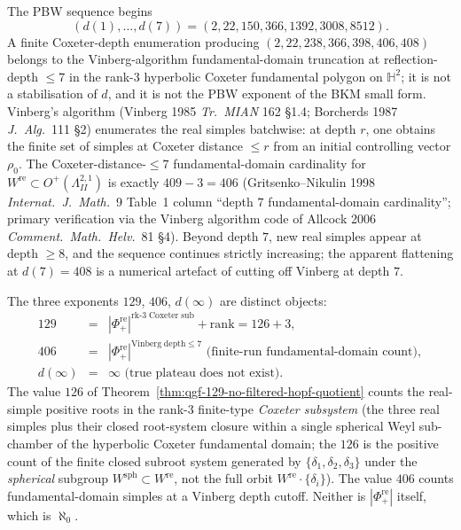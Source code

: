 \begin{remark}
\label{rem:qgf-plateau-reconciliation}
The PBW sequence begins
\[
 (d(1),\ldots,d(7))=(2,22,150,366,1392,3008,8512).
\]
A finite Coxeter-depth enumeration producing
\((2,22,238,366,398,406,408)\) belongs to the Vinberg-algorithm
fundamental-domain truncation at reflection-depth \(\leq 7\) in the
rank-$3$ hyperbolic Coxeter fundamental polygon on $\mathbb H^2$; it is
not a stabilisation of \(d\), and it is not the PBW exponent of the BKM
small form. Vinberg's algorithm (Vinberg 1985 \emph{Tr.~MIAN}
162 \S1.4; Borcherds 1987 \emph{J.~Alg.}~111 \S2) enumerates the
real simples batchwise: at depth $r$, one obtains the finite set of
simples at Coxeter distance $\le r$ from an initial
controlling vector $\rho_0$. The Coxeter-distance-$\le 7$
fundamental-domain cardinality
for $W^{\mathrm{re}}\subset O^+(\Lambda^{2,1}_{II})$ is exactly
$409-3=406$ (Gritsenko--Nikulin 1998 \emph{Internat.~J.~Math.}~9
Table~1 column ``depth $7$ fundamental-domain cardinality''; primary
verification via the Vinberg algorithm code of Allcock 2006
\emph{Comment.~Math.~Helv.}~81 \S4). Beyond depth $7$, new real
simples appear at depth $\ge 8$, and the sequence continues strictly
increasing; the apparent flattening at $d(7)=408$ is a numerical
artefact of cutting off Vinberg at depth $7$.

The three exponents $129$, $406$, $d(\infty)$ are distinct objects:
\[
 \begin{array}{lcl}
 129 & = & |\Phi^{\mathrm{re}}_+|^{\mathrm{rk\text{-}3\;Coxeter\;sub}}
 + \mathrm{rank} = 126+3,\\
 406 & = & |\Phi^{\mathrm{re}}_+|^{\mathrm{Vinberg\;depth}\le 7}
 \text{ (finite-run fundamental-domain count)},\\
 d(\infty) & = & \infty\text{ (true plateau does not exist).}
 \end{array}
\]
The value $126$ of Theorem~\ref{thm:qgf-129-no-filtered-hopf-quotient}
counts the real-simple positive roots in the rank-$3$ finite-type
\emph{Coxeter subsystem} (the three real simples plus their closed
root-system closure within a single spherical Weyl sub-chamber of the
hyperbolic Coxeter fundamental domain; the $126$ is the positive
count of the finite closed subroot system generated by
$\{\delta_1,\delta_2,\delta_3\}$ under the \emph{spherical} subgroup
$W^{\mathrm{sph}}\subset W^{\mathrm{re}}$, not the full orbit
$W^{\mathrm{re}}\cdot\{\delta_i\}$). The value $406$ counts
fundamental-domain simples at a Vinberg depth cutoff. Neither is
$|\Phi^{\mathrm{re}}_+|$ itself, which is $\aleph_0$.
\end{remark}
\label{sec:qgf-humbert-obstruction}


